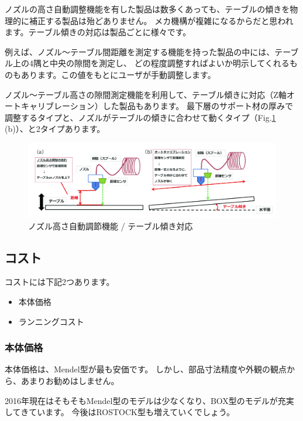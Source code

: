 ノズルの高さ自動調整機能を有した製品は数多くあっても、テーブルの傾きを物理的に補正する製品は殆どありません。
メカ機構が複雑になるからだと思われます。テーブル傾きの対応は製品ごとに様々です。

例えば、ノズル～テーブル間距離を測定する機能を持った製品の中には、テーブル上の4隅と中央の隙間を測定し、
どの程度調整すればよいか明示してくれるものもあります。この値をもとにユーザが手動調整します。

ノズル～テーブル高さの隙間測定機能を利用して、テーブル傾きに対応（Z軸オートキャリブレーション）した製品もあります。
最下層のサポート材の厚みで調整するタイプと、ノズルがテーブルの傾きに合わせて動くタイプ（Fig.\ref{fig33}
(b)）、と2タイプあります。

\begin{figure}[htbp]
\centering
\includegraphics[width=380pt]{fig/fig33_cmyk.jpg}
\caption{ノズル高さ自動調節機能 / テーブル傾き対応}
\label{fig33}
\end{figure}

\subsection{コスト}\label{ux30b3ux30b9ux30c8}

コストには下記2つあります。

\begin{itemize}
\tightlist
\item
  本体価格
\item
  ランニングコスト
\end{itemize}

\subsubsection{本体価格}\label{ux672cux4f53ux4fa1ux683c}

本体価格は、Mendel型が最も安価です。
しかし、部品寸法精度や外観の観点から、あまりお勧めはしません。

2016年現在はそもそもMendel型のモデルは少なくなり、BOX型のモデルが充実してきています。
今後はROSTOCK型も増えていくでしょう。

